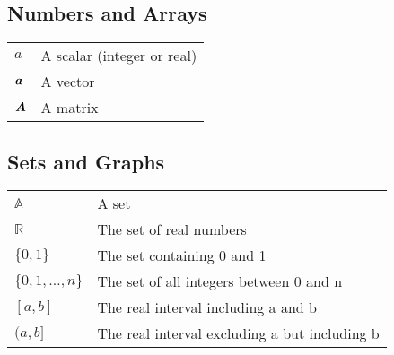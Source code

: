 \newpage

{\hypersetup{linkcolor=black}
\thesistableofcontents
}
\clearpage


\subsection*{Numbers and Arrays}

\begin{tabular}{ll}
  $a$                 & A scalar (integer or real) \\
  $\textbf{\em a}$        & A vector \\
  $\textbf{\em A}$        & A matrix \\
\end{tabular}

\subsection*{Sets and Graphs}

\begin{tabular}{ll}
  $\mathbb{A}$        & A set \\
  $\mathbb{R}$        & The set of real numbers \\
  $\{0, 1\}$          & The set containing 0 and 1 \\
  $\{0,1,\ldots,n\}$  & The set of all integers between 0 and n \\
  $[a, b]$            & The real interval including a and b \\
  $(a, b]$            & The real interval excluding a but including b \\
\end{tabular}



\cleardoublepage
\storeinipagenumber
{}
\setcounter{page}{1}
